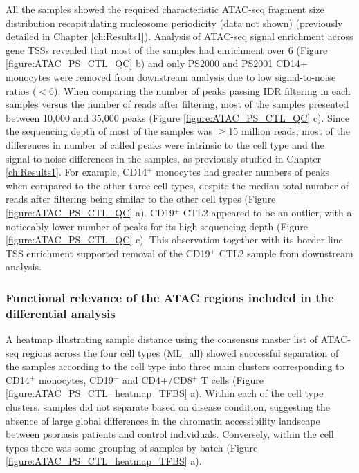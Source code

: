 All the samples showed the required characteristic ATAC-seq fragment size distribution recapitulating nucleosome periodicity (data not shown) (previously detailed in Chapter \ref{ch:Results1}). Analysis of ATAC-seq signal enrichment across gene TSSs revealed that most of the samples had enrichment over 6 (Figure \ref{figure:ATAC_PS_CTL_QC} b) and only PS2000 and PS2001 CD14$+$ monocytes were removed from downstream analysis due to low signal-to-noise ratios ($<$6). When comparing the number of peaks passing IDR filtering in each samples versus the number of reads after filtering, most of the samples presented between 10,000 and 35,000 peaks (Figure \ref{figure:ATAC_PS_CTL_QC} c). Since the sequencing depth of most of the samples was $\geq$15 million reads, most of the differences in number of called peaks were intrinsic to the cell type and the signal-to-noise differences in the samples, as previously studied in Chapter \ref{ch:Results1}. For example, CD14$^+$ monocytes had greater numbers of peaks when compared to the other three cell types, despite the median total number of reads after filtering being similar to the other cell types (Figure \ref{figure:ATAC_PS_CTL_QC} a). %
CD19$^+$ CTL2 appeared to be an outlier, with a noticeably lower number of peaks for its high sequencing depth (Figure \ref{figure:ATAC_PS_CTL_QC} c). This observation together with its border line TSS enrichment supported removal of the CD19$^+$ CTL2 sample from downstream analysis.


\subsubsection{Functional relevance of the ATAC regions included in the differential analysis}

A heatmap illustrating sample distance using the consensus master list of ATAC-seq regions across the four cell types (ML\_all) showed successful separation of the samples according to the cell type into three main clusters corresponding to CD14$^+$ monocytes, CD19$^+$ and CD4$+$/CD8$^+$ T cells (Figure \ref{figure:ATAC_PS_CTL_heatmap_TFBS} a). Within each of the cell type clusters, samples did not separate based on disease condition, suggesting the absence of large global differences in the chromatin accessibility landscape between psoriasis patients and control individuals. Conversely, within the cell types there was some grouping of samples by batch (Figure \ref{figure:ATAC_PS_CTL_heatmap_TFBS} a).

